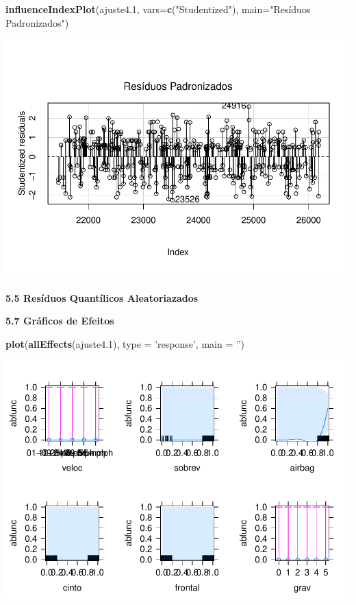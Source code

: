 \documentclass[]{article}
\newenvironment{Shaded}{\begin{snugshade}}{\end{snugshade}}
\newcommand{\KeywordTok}[1]{\textcolor[rgb]{0.13,0.29,0.53}{\textbf{{#1}}}}
\newcommand{\DataTypeTok}[1]{\textcolor[rgb]{0.13,0.29,0.53}{{#1}}}
\newcommand{\FloatTok}[1]{\textcolor[rgb]{0.00,0.00,0.81}{{#1}}}
\newcommand{\StringTok}[1]{\textcolor[rgb]{0.31,0.60,0.02}{{#1}}}
\newcommand{\NormalTok}[1]{{#1}}
\begin{document}
\begin{Shaded}
\begin{Highlighting}[]
\KeywordTok{influenceIndexPlot}\NormalTok{(ajuste4}\FloatTok{.1}\NormalTok{, }\DataTypeTok{vars=}\KeywordTok{c}\NormalTok{(}\StringTok{"Studentized"}\NormalTok{), }\DataTypeTok{main=}\StringTok{"Resíduos Padronizados"}\NormalTok{)}
\end{Highlighting}
\end{Shaded}

\includegraphics{Dados_Binários1_files/figure-latex/unnamed-chunk-19-1.pdf}

\textbf{5.5 Resíduos Quantílicos Aleatoriazados}

\textbf{5.7 Gráficos de Efeitos}

\begin{Shaded}
\begin{Highlighting}[]
\KeywordTok{plot}\NormalTok{(}\KeywordTok{allEffects}\NormalTok{(ajuste4}\FloatTok{.1}\NormalTok{), }\DataTypeTok{type =} \StringTok{'response'}\NormalTok{, }\DataTypeTok{main =} \StringTok{''}\NormalTok{)}
\end{Highlighting}
\end{Shaded}

\includegraphics{Dados_Binários1_files/figure-latex/unnamed-chunk-20-1.pdf}
\end{document}
